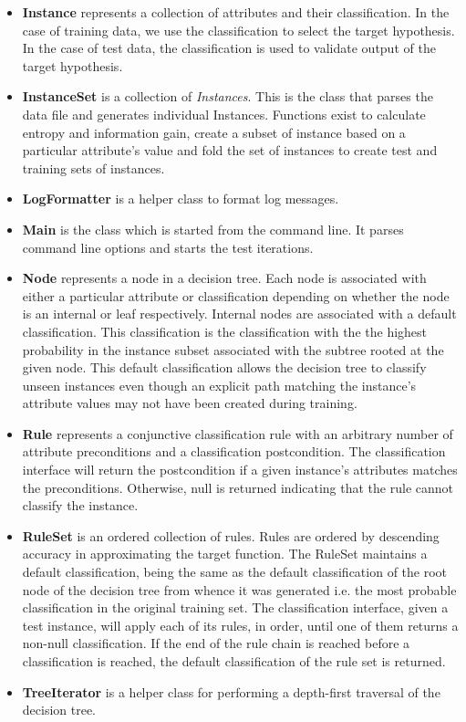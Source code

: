 \documentclass[10pt]{report}
\begin{document}
\begin{itemize}
\item \textbf{Instance} represents a collection of attributes and
  their classification. In the case of training data, we use the
  classification to select the target hypothesis. In the case of test
  data, the classification is used to validate output of the target
  hypothesis.

\item \textbf{InstanceSet} is a collection of \textit{Instances}. This is the
  class that parses the data file and generates individual
  Instances. Functions exist to calculate entropy and information
  gain, create a subset of instance based on a particular attribute's
  value and fold the set of instances to create test and training sets
  of instances.

\item \textbf{LogFormatter} is a helper class to format log messages.

\item \textbf{Main} is the class which is started from the command
  line. It parses command line options and starts the test iterations.

\item \textbf{Node} represents a node in a decision tree. Each node is
  associated with either a particular attribute or classification
  depending on whether the node is an internal or leaf
  respectively. Internal nodes are associated with a default
  classification. This classification is the classification with the
  the highest probability in the instance subset associated with the
  subtree rooted at the given node. This default classification allows
  the decision tree to classify unseen instances even though an explicit
  path matching the instance's attribute values may not have been
  created during training. 

\item \textbf{Rule} represents a conjunctive classification rule with
  an arbitrary number of attribute preconditions and a classification
  postcondition. The classification interface will return the
  postcondition if a given instance's attributes matches the
  preconditions. Otherwise, null is returned indicating that the rule
  cannot classify the instance.

\item \textbf{RuleSet} is an ordered collection of rules. Rules are
  ordered by descending accuracy in approximating the target
  function. The RuleSet maintains a default classification, being the
  same as the default classification of the root node of the decision
  tree from whence it was generated i.e. the most probable
  classification in the original training set. The classification
  interface, given a test instance, will apply each of 
  its rules, in order, until one of them returns a non-null
  classification. If the end of the rule chain is reached before a
  classification is reached, the default classification of the rule
  set is returned.

\item \textbf{TreeIterator} is a helper class for performing a
  depth-first traversal of the decision tree.

\end{itemize}
\end{document}
